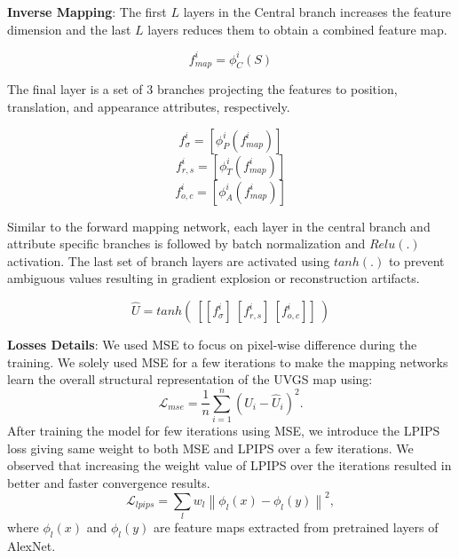 


\noindent\textbf{Inverse Mapping}:
The first $L$ layers in the Central branch increases the feature dimension and the last $L$ layers reduces them to obtain a combined feature map. 

    \[
   f^i_{map} = \phi^i_{C}(S) 
   \]

The final layer is a set of 3 branches projecting the features to position, translation, and appearance attributes, respectively. 

    \[
   f^i_{\sigma} = [\phi^i_{P}(f^i_{map})] 
   \]
    \[
   f^i_{r,s} = [\phi^i_{T}(f^i_{map})] 
   \]
    \[
   f^i_{o,c} = [\phi^i_{A}(f^i_{map})] 
   \]


Similar to the forward mapping network, each layer in the central branch and attribute specific branches is followed by batch normalization and $Relu(.)$ activation. 
The last set of branch layers are activated using $tanh(.)$ to prevent ambiguous values resulting in gradient explosion or reconstruction artifacts.

   \[
   \hat{U} = tanh(~ [ [f^i_{\sigma}]~[f^i_{r,s}]~[f^i_{o,c}] ] ~)
   \]

\noindent \textbf{Losses Details}: We used MSE to focus on pixel-wise difference during the training. We solely used MSE for a few iterations to make the mapping networks learn the overall structural representation of the UVGS map using:
\begin{equation}
\mathcal{L}_{mse} = \frac{1}{n} \sum_{i=1}^n (U_i - \hat{U}_i)^2.
\end{equation}
After training the model for few iterations using MSE, we introduce the LPIPS loss giving same weight to both MSE and LPIPS over a few iterations. We observed that increasing the weight value of LPIPS over the iterations resulted in better and faster convergence results.
\begin{equation}
    \mathcal{L}_{lpips} = \sum_{l} w_l \left\| \phi_l(x) - \phi_l(y) \right\|^2,
\end{equation}
where $\phi_l(x)$ and $\phi_l(y)$ are feature maps extracted from pretrained layers of AlexNet\cite{lpips2018}.


